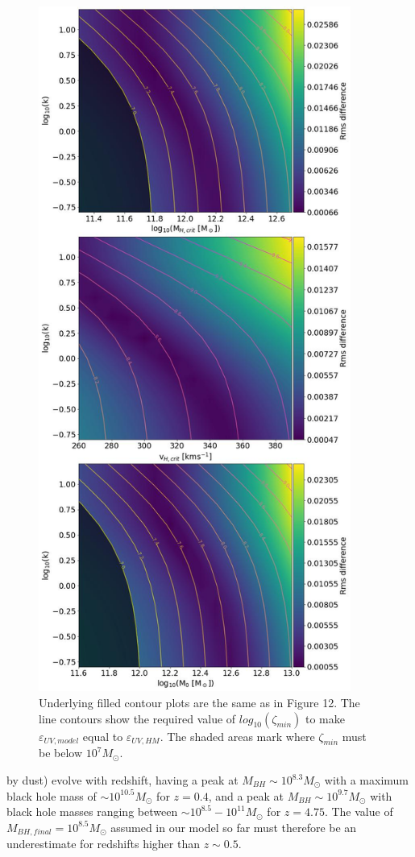 \documentclass[12pt]{article}%
\begin{document}
\begin{figure}[H]
\centering
\includegraphics[width=10.25cm]{Plot_11_2.jpeg}
\caption{Underlying filled contour plots are the same as in Figure 12. The line contours show the required value of $log_{10}(\zeta_{min})$ to make $\varepsilon_{UV,model}$ equal to $\varepsilon_{UV,HM}$. The shaded areas mark where $\zeta_{min}$ must be below $10^7M_\odot$.}
\label{fig:13}
\end{figure}
\clearpage
\twocolumngrid


\noindent by dust) evolve with redshift, having a peak at $M_{BH}\sim10^{8.3}M_\odot$ with a maximum black hole mass of $\sim10^{10.5}M_\odot$ for $z=0.4$, and a peak at $M_{BH}\sim10^{9.7}M_\odot$ with black hole masses ranging between $\sim10^{8.5}-10^{11}M_\odot$ for $z=4.75$. The value of $M_{BH,final}=10^{8.5}M_\odot$ assumed in our model so far must therefore be an underestimate for redshifts higher than $z\sim0.5$.\par
\end{document}
